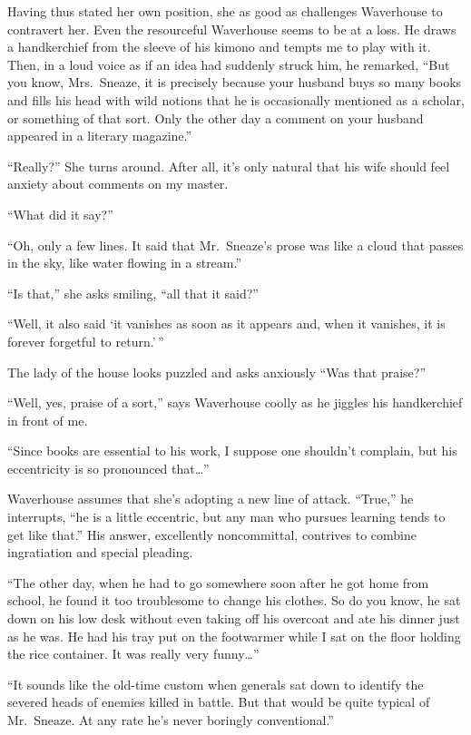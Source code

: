 \documentclass{book}
\begin{document}
Having thus stated her own position, she as good as challenges
Waverhouse to contravert her. Even the resourceful Waverhouse seems to
be at a loss. He draws a handkerchief from the sleeve of his kimono and
tempts me to play with it. Then, in a loud voice as if an idea had
suddenly struck him, he remarked, ``But you know, Mrs.~Sneaze, it is
precisely because your husband buys so many books and fills his head
with wild notions that he is occasionally mentioned as a scholar, or
something of that sort. Only the other day a comment on your husband
appeared in a literary magazine.''

``Really?'' She turns around. After all, it's only natural that his wife
should feel anxiety about comments on my master.

``What did it say?''

``Oh, only a few lines. It said that Mr.~Sneaze's prose was like a cloud
that passes in the sky, like water flowing in a stream.''

``Is that,'' she asks smiling, ``all that it said?''

``Well, it also said `it vanishes as soon as it appears and, when it
vanishes, it is forever forgetful to return.'\,''

The lady of the house looks puzzled and asks anxiously ``Was that
praise?''

``Well, yes, praise of a sort,'' says Waverhouse coolly as he jiggles
his handkerchief in front of me.

``Since books are essential to his work, I suppose one shouldn't
complain, but his eccentricity is so pronounced that\ldots{}''

Waverhouse assumes that she's adopting a new line of attack. ``True,''
he interrupts, ``he is a little eccentric, but any man who pursues
learning tends to get like that.'' His answer, excellently noncommittal,
contrives to combine ingratiation and special pleading.

``The other day, when he had to go somewhere soon after he got home from
school, he found it too troublesome to change his clothes. So do you
know, he sat down on his low desk without even taking off his overcoat
and ate his dinner just as he was. He had his tray put on the footwarmer
while I sat on the floor holding the rice container. It was really very
funny\ldots{}''

``It sounds like the old-time custom when generals sat down to identify
the severed heads of enemies killed in battle. But that would be quite
typical of Mr.~Sneaze. At any rate he's never boringly conventional.''
\end{document}
